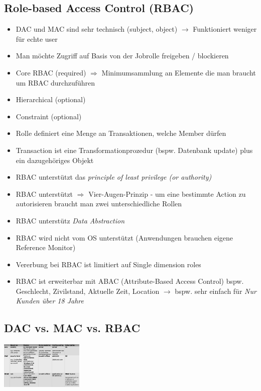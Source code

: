 \documentclass{report}
\newenvironment{Figure}
	{\par\medskip\noindent\minipage{\linewidth}}
	{\endminipage\par\medskip}
\theoremstyle{definition}
\theoremstyle{example}
\begin{document}
	\subsection{Role-based Access Control (RBAC)}
\begin{itemize}
	\item DAC und MAC sind sehr technisch (subject, object) $\rightarrow$ Funktioniert weniger für echte user
	\item Man möchte Zugriff auf Basis von der Jobrolle freigeben / blockieren
	\item Core RBAC (required) $\Rightarrow$ Minimumsammlung an Elemente die man braucht um RBAC durchzuführen
	\item Hierarchical (optional)
	\item Constraint (optional)
	\item Rolle definiert eine Menge an Transaktionen, welche Member dürfen
	\item Transaction ist eine Transformationprozedur (bspw. Datenbank update) plus ein dazugehöriges Objekt
	\item RBAC unterstützt das \textit{principle of least privilege (or authority)}
	\item RBAC unterstützt  $\Rightarrow$ Vier-Augen-Prinzip - um eine bestimmte Action zu autorisieren braucht man zwei unterschiedliche Rollen
	\item RBAC unterstütz \textit{Data Abstraction}
	\item RBAC wird nicht vom OS unterstützt (Anwendungen brauchen eigene Reference Monitor)
	\item Vererbung bei RBAC ist limitiert auf Single dimension roles
	\item RBAC ist erweiterbar mit ABAC (Attribute-Based Access Control) bspw. Geschlecht, Zivilstand, Aktuelle Zeit, Location $\rightarrow$ bspw. sehr einfach für \textit{Nur Kunden über 18 Jahre}
\end{itemize}

	\subsection{DAC vs. MAC vs. RBAC}
\begin{Figure}
\centering
\includegraphics[width=150px]{img/AccessControlModels.png}
	\label{fig:Abbildung einer Übersicht der verschiedenen Modellen}
\end{Figure}
\end{document}

